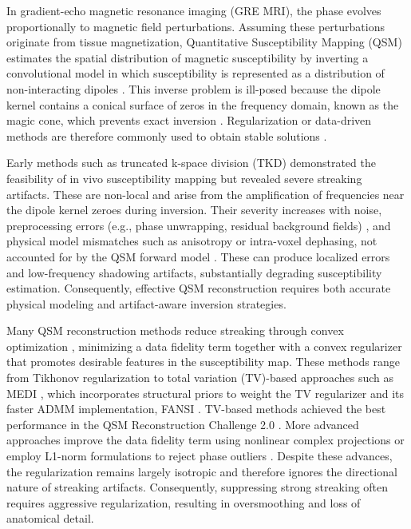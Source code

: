 \documentclass{article}
\begin{document}
In gradient-echo magnetic resonance imaging (GRE MRI), the phase evolves proportionally to magnetic field perturbations. Assuming these perturbations originate from tissue magnetization, Quantitative Susceptibility Mapping (QSM) estimates the spatial distribution of magnetic susceptibility by inverting a convolutional model in which susceptibility is represented as a distribution of non-interacting dipoles \cite{brown2014magnetic,qsm2024recommended,choi2014inverse}. This inverse problem is ill-posed because the dipole kernel contains a conical surface of zeros in the frequency domain, known as the magic cone, which prevents exact inversion \cite{salomir2003fast,marques2005application}. Regularization or data-driven methods are therefore commonly used to obtain stable solutions \cite{kee2017quantitative}.

Early methods such as truncated k-space division (TKD) \cite{shmueli2009magnetic,wharton2010susceptibility} demonstrated the feasibility of in vivo susceptibility mapping but revealed severe streaking artifacts. These are non-local and arise from the amplification of frequencies near the dipole kernel zeroes during inversion. Their severity increases with noise, preprocessing errors (e.g., phase unwrapping, residual background fields) \cite{schweser2017illustrated,qsm2024recommended}, and physical model mismatches such as anisotropy or intra-voxel dephasing, not accounted for by the QSM forward model \cite{schweser2018quantitative,li2017susceptibility,milovic20202016}. These can produce localized errors and low-frequency shadowing artifacts, substantially degrading susceptibility estimation. Consequently, effective QSM reconstruction requires both accurate physical modeling and artifact-aware inversion strategies.

Many QSM reconstruction methods reduce streaking through convex optimization \cite{bilgic2015sparse}, minimizing a data fidelity term together with a convex regularizer that promotes desirable features in the susceptibility map. These methods range from Tikhonov regularization to total variation (TV)-based approaches such as MEDI \cite{liu2013nonlinear}, which incorporates structural priors \cite{kee2018coherence} to weight the TV regularizer \cite{rudin1992nonlinear} and its faster ADMM implementation, FANSI \cite{milovic2018fast}. TV-based methods achieved the best performance in the QSM Reconstruction Challenge 2.0 \cite{qsm2021qsm}. More advanced approaches improve the data fidelity term using nonlinear complex projections \cite{liu2013nonlinear,milovic2018fast,polak2020nonlinear} or employ L1-norm formulations to reject phase outliers \cite{milovic2022streaking}. Despite these advances, the regularization remains largely isotropic and therefore ignores the directional nature of streaking artifacts. Consequently, suppressing strong streaking often requires aggressive regularization, resulting in oversmoothing and loss of anatomical detail.
\end{document}
